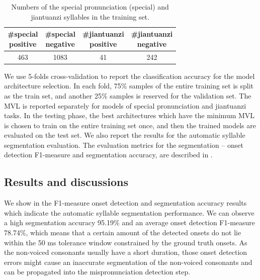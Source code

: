 \begin{table}[ht!]
\centering
\caption{Numbers of the special pronunciation (special) and jiantuanzi syllables in the training set.}
\label{tab:ch6:num_syllables_training_set}
\begin{tabular}{cccc}
\toprule
\makecell{\#special\\positive} & \makecell{\#special\\negative} & \makecell{\#jiantuanzi\\positive} & \makecell{\#jiantuanzi\\negative} \\
\midrule
463 & 1083 & 41 & 242 \\
\bottomrule
\end{tabular}
\end{table}

We use 5-folds cross-validation to report the classification accuracy for the model architecture selection. In each fold, 75\% samples of the entire training set is split as the train set, and another 25\% samples is reserved for the validation set. The \gls{MVL} is reported separately for models of special pronunciation and \gls{jiantuanzi} tasks. In the testing phase, the best architectures which have the minimum \gls{MVL} is chosen to train on the entire training set once, and then the trained models are evaluated on the test set. We also report the results for the automatic syllable segmentation evaluation. The evaluation metrics for the segmentation -- onset detection F1-measure and segmentation accuracy, are described in . 

\subsection{Results and discussions}

We show in  the F1-measure onset detection and segmentation accuracy results which indicate the automatic syllable segmentation performance. We can observe a high segmentation accuracy 95.19\% and an average onset detection F1-measure 78.74\%, which means that a certain amount of the detected onsets do not lie within the 50 ms tolerance window constrained by the ground truth onsets. As the non-voiced consonants usually have a short duration, those onset detection errors might cause an inaccurate segmentation of the non-voiced consonants and can be propagated into the mispronunciation detection step. 

